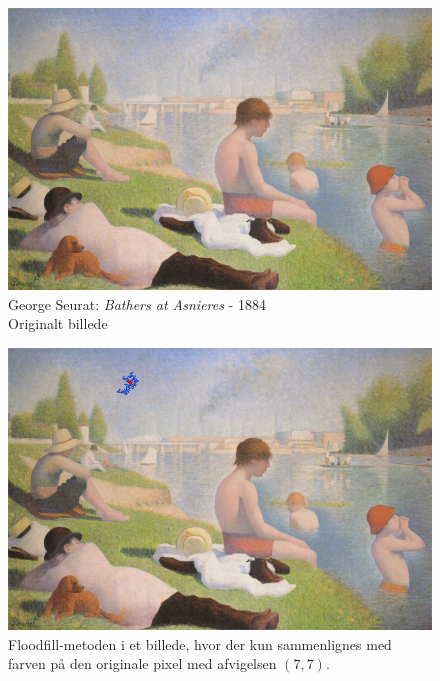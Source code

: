 {%
\begin{figure}[!h]
    \begin{center}
        \includegraphics[scale=8]{afsnit/vores_implementation/billeder/flood_fill/seurat_bathers}
    \end{center}
    \caption[George Seurat: \emph{Bathers at Asnieres} - 1884]{George
    Seurat: \emph{Bathers at Asnieres} - 1884\\Originalt billede}
    \label{bathers}
\end{figure}

\begin{figure}[!h]
    \begin{center}
        \includegraphics[scale=0.49]{afsnit/vores_implementation/billeder/flood_fill/dot_ff_fixed_7_7}
    \end{center}
    \caption[]{Floodfill-metoden i et billede, hvor der kun sammenlignes
    med farven på den originale pixel med afvigelsen $(7,7)$.}
    \label{dot_ff_fixed_7_7}
\end{figure}

}
